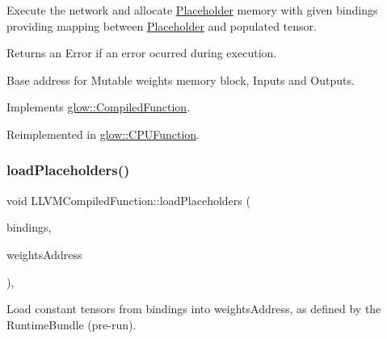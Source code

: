 Execute the network and allocate \hyperlink{classglow_1_1_placeholder}{Placeholder} memory with given {\ttfamily bindings} providing mapping between \hyperlink{classglow_1_1_placeholder}{Placeholder} and populated tensor. \begin{DoxyReturn}{Returns}
an Error if an error ocurred during execution. 
\end{DoxyReturn}
Base address for Mutable weights memory block, Inputs and Outputs. 

Implements \hyperlink{classglow_1_1_compiled_function_ac8dd94f2ee7129a435f1701b6a9f419e}{glow\+::\+Compiled\+Function}.



Reimplemented in \hyperlink{classglow_1_1_c_p_u_function_a31625d840ca33030c6762955c93d82a1}{glow\+::\+C\+P\+U\+Function}.

\mbox{\label{classglow_1_1_l_l_v_m_compiled_function_aa824762bc57cd44931e79100e2011f1f}} 
\subsubsection{\texorpdfstring{load\+Placeholders()}{loadPlaceholders()}}
{\footnotesize\ttfamily void L\+L\+V\+M\+Compiled\+Function\+::load\+Placeholders (\begin{DoxyParamCaption}\item[{\hyperlink{classglow_1_1_placeholder_bindings}{Placeholder\+Bindings} $\ast$}]{bindings,  }\item[{uint8\+\_\+t $\ast$}]{weights\+Address }\end{DoxyParamCaption})\hspace{0.3cm}{\ttfamily [protected]}, {\ttfamily [virtual]}}

Load constant tensors from {\ttfamily bindings} into {\ttfamily weights\+Address}, as defined by the Runtime\+Bundle (pre-\/run). \mbox{\label{classglow_1_1_l_l_v_m_compiled_function_a2ed315983546c8c45f2f34b8d935562b}} 
